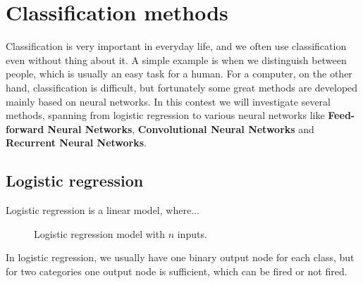 \section{Classification methods} \label{sec:methods}
Classification is very important in everyday life, and we often use classification even without thing about it. A simple example is when we distinguish between people, which is usually an easy task for a human. For a computer, on the other hand, classification is difficult, but fortunately some great methods are developed mainly based on neural networks. In this contest we will investigate several methods, spanning from logistic regression to various neural networks like \textbf{Feed-forward Neural Networks}, \textbf{Convolutional Neural Networks} and \textbf{Recurrent Neural Networks}. 

\subsection{Logistic regression}
Logistic regression is a linear model, where...

\begin{figure} [H]
	\centering
	\caption{Logistic regression model with $n$ inputs.}
	\label{fig:single_perceptron}
\end{figure}
In logistic regression, we usually have one binary output node for each class, but for two categories one output node is sufficient, which can be fired or not fired. 

